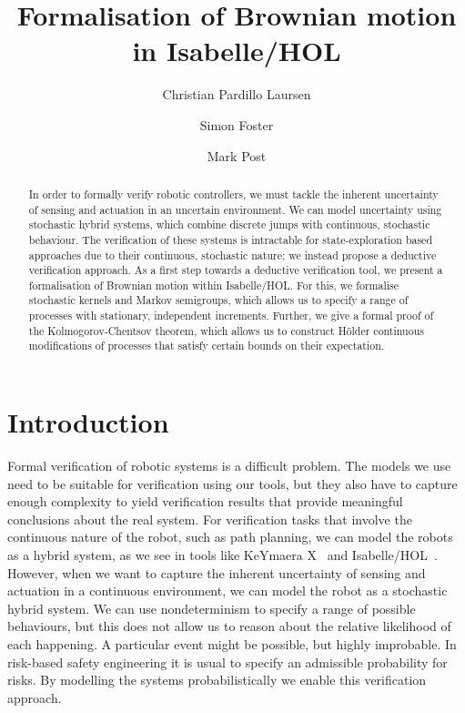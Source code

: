 \documentclass[orivec, envcountsame]{llncs}
\title{Formalisation of Brownian motion in Isabelle/HOL}
\author{Christian Pardillo Laursen \and Simon Foster \and Mark Post}
\institute{University of York}
\begin{document}
\maketitle

\begin{abstract}
In order to formally verify robotic controllers, we must tackle the inherent uncertainty of sensing and actuation in an uncertain environment. We can model uncertainty using stochastic hybrid systems, which combine discrete jumps with continuous, stochastic behaviour. The verification of these systems is intractable for state-exploration based approaches due to their continuous, stochastic nature; we instead propose a deductive verification approach. As a first step towards a deductive verification tool, we present a formalisation of Brownian motion within Isabelle/HOL. For this, we formalise stochastic kernels and Markov semigroups, which allows us to specify a range of processes with stationary, independent increments. Further, we give a formal proof of the Kolmogorov-Chentsov theorem, which allows us to construct H{\"o}lder continuous modifications of processes that satisfy certain bounds on their expectation.
\end{abstract}

\section{Introduction}

Formal verification of robotic systems is a difficult problem. The models we use need to be suitable for verification using our tools, but they also have to capture enough complexity to yield verification results that provide meaningful conclusions about the real system. For verification tasks that involve the continuous nature of the robot, such as path planning, we can model the robots as a hybrid system, as we see in tools like KeYmaera X~\cite{keymaerax} and Isabelle/HOL~\cite{foster21}. However, when we want to capture the inherent uncertainty of sensing and actuation in a continuous environment, we can model the robot as a stochastic hybrid system. We can use nondeterminism to specify a range of possible behaviours, but this does not allow us to reason about the relative likelihood of each happening. A particular event might be possible, but highly improbable. In risk-based safety engineering it is usual to specify an admissible probability for risks. By modelling the systems probabilistically we enable this verification approach.
\end{document}
